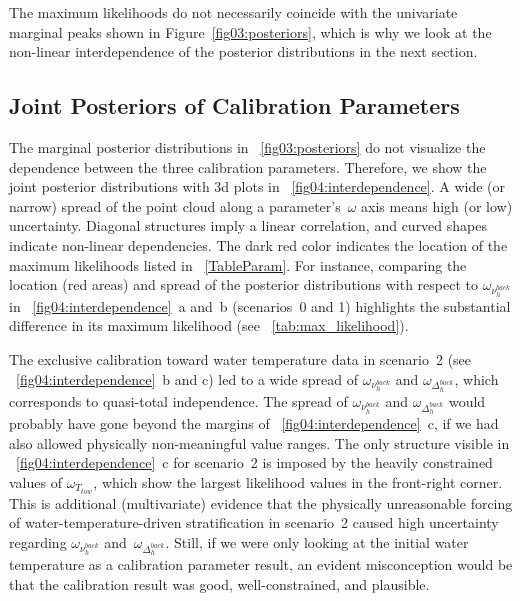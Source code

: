 \documentclass[draft,linenumbers,onecolumn]{agujournal2019} %
\begin{document}
The maximum likelihoods do not necessarily coincide with the univariate marginal peaks shown in Figure~\ref{fig03:posteriors}, which is why we look at the non-linear interdependence of the posterior distributions in the next section.

\subsection{Joint Posteriors of Calibration Parameters}

The marginal posterior distributions in \figurename{~\ref{fig03:posteriors}} do not visualize the dependence between the three calibration parameters. Therefore, we show the joint posterior distributions with 3d plots in \figurename{~\ref{fig04:interdependence}}. A wide (or narrow) spread of the point cloud along a parameter's~$\omega$ axis means high (or low) uncertainty. Diagonal structures imply a linear correlation, and curved shapes indicate non-linear dependencies. The dark red color indicates the location of the maximum likelihoods listed in \tablename{~\ref{TableParam}}. For instance, comparing the location (red areas) and spread of the posterior distributions with respect to $\omega_{\nu_{h}^{back}}$ in \figurename{~\ref{fig04:interdependence}}~a and~b (scenarios~0 and 1) highlights the substantial difference in its maximum likelihood (see \tablename{~\ref{tab:max_likelihood}}).

The exclusive calibration toward water temperature data in scenario~2 (see \figurename{~\ref{fig04:interdependence}}~b and c) led to a wide spread of $\omega_{\nu_{h}^{back}}$ and $\omega_{\Delta_{h}^{back}}$, which corresponds to quasi-total independence. The spread of $\omega_{\nu_{h}^{back}}$ and $\omega_{\Delta_{h}^{back}}$ would probably have gone beyond the margins of \figurename{~\ref{fig04:interdependence}}~c, if we had also allowed physically non-meaningful value ranges. The only structure visible in \figurename{~\ref{fig04:interdependence}}~c for scenario~2 is imposed by the heavily constrained values of $\omega_{T_{tow}}$, which show the largest likelihood values in the front-right corner. This is additional (multivariate) evidence that the physically unreasonable forcing of water-temperature-driven stratification in scenario~2 caused high uncertainty regarding $\omega_{\nu_{h}^{back}}$ and~$\omega_{\Delta_{h}^{back}}$. Still, if we were only looking at the initial water temperature as a calibration parameter result, an evident misconception would be that the calibration result was good, well-constrained, and plausible.
\end{document}

